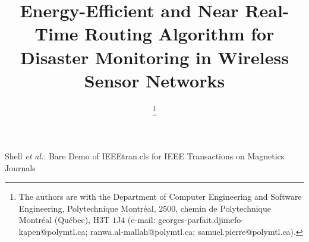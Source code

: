 \documentclass[journal]{IEEEtran}
\begin{document}
%
\title{Energy-Efficient and Near Real-Time Routing Algorithm for Disaster Monitoring in Wireless Sensor Networks}




\author{
\thanks{The authors are with the Department of Computer Engineering and Software Engineering, Polytechnique Montréal, $2500$, chemin de Polytechnique
Montréal (Québec), H$3$T $1$J$4$ (e-mail: georges-parfait.djimefo-kapen@polymtl.ca; ranwa.al-mallah@polymtl.ca; samuel.pierre@polymtl.ca).}}



%
{Shell \MakeLowercase{\textit{et al.}}: Bare Demo of IEEEtran.cls for IEEE Transactions on Magnetics Journals}
% 
\end{document}
